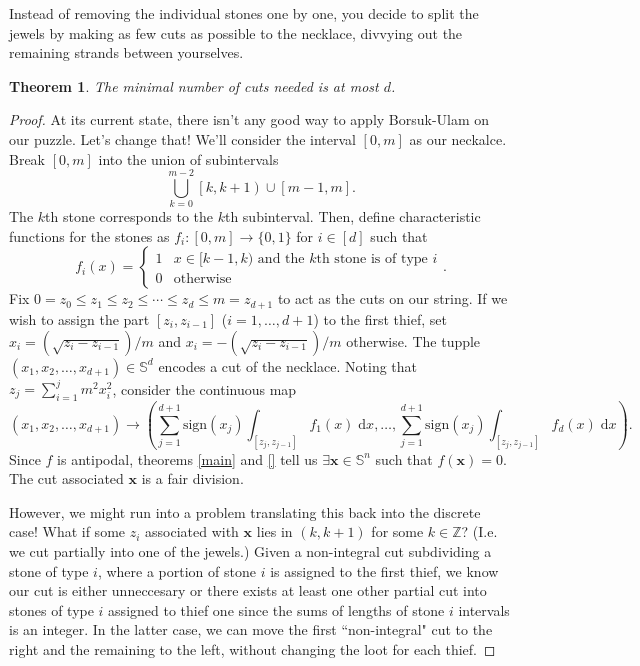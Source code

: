 \documentclass[12pt]{amsart}
\newtheorem{thm}{Theorem}[section]
\theoremstyle{definition}
\begin{document}
    Instead of removing the individual stones one by one, you decide to split the jewels by making as few cuts as possible to the necklace, divvying out the remaining strands between yourselves. 

    \begin{thm}
        The minimal number of cuts needed is at most $d$.
    \end{thm}

    \begin{proof}
        At its current state, there isn't any good way to apply Borsuk-Ulam on our puzzle. Let's change that! We'll consider the interval $[0,m]$ as our neckalce. Break $[0,m]$ into the union of subintervals $$\bigcup_{k=0}^{m-2} \left[k, k+1\right) \cup \left[m-1, m\right].$$ The $k$th stone corresponds to the $k$th subinterval. Then, define characteristic functions for the stones as $f_i:[0,m] \to \{0,1\}$ for $i \in [d]$ such that $$f_i(x) = \begin{cases} 1 & x \in [k-1, k) \text{ and the $k$th stone is of type $i$}\\ 0 & \text{otherwise} \end{cases}.$$ Fix $0 = z_0 \leq z_1 \leq z_2 \leq \cdots \leq z_d \leq m= z_{d+1}$ to act as the cuts on our string. If we wish to assign the part $[z_i,z_{i-1}]$ ($i = 1, \ldots, d+1$) to the first thief, set $x_i = \left(\sqrt{z_{i} - z_{i-1}}\right)/m$ and $x_i = -\left(\sqrt{z_i - z_{i-1}}\right)/m$ otherwise. The tupple $(x_1,x_2,\ldots,x_{d+1}) \in \mathbb S^d$ encodes a cut of the necklace. Noting that $z_j = \sum_{i=1}^{j} m^2x_i^2$, consider the continuous map $$(x_1,x_2,\ldots,x_{d+1}) \to \left(\sum_{j=1}^{d+1} \mathrm{sign}(x_j) \int_{[z_j,z_{j-1}]} f_1(x) \; \mathrm{d}x , \ldots, \sum_{j=1}^{d+1} \mathrm{sign}(x_j) \int_{[z_j,z_{j-1}]} f_d(x) \; \mathrm{d}x\right).$$ Since $f$ is antipodal, theorems \ref{main} and \ref{} tell us $\exists \mathbf x \in \mathbb S^n$ such that $f(\mathbf x) = 0$. The cut associated $\mathbf x$ is a fair division. 

        However, we might run into a problem translating this back into the discrete case! What if some $z_i$ associated with $\mathbf x$ lies in $\left(k, k+1\right)$ for some $k \in \mathbb Z$? (I.e. we cut partially into one of the jewels.) Given a non-integral cut subdividing a stone of type $i$, where a portion of stone $i$ is assigned to the first thief, we know our cut is either unneccesary or there exists at least one other partial cut into stones of type $i$ assigned to thief one since the sums of lengths of stone $i$ intervals is an integer. In the latter case, we can move the first ``non-integral" cut to the right and the remaining to the left, without changing the loot for each thief.
    \end{proof}
    
\end{document}

